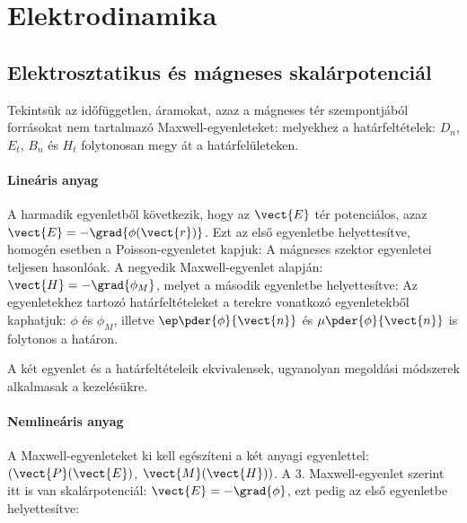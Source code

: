  \section{Elektrodinamika}
  
  \subsection{Elektrosztatikus és mágneses skalárpotenciál}
   
   Tekintsük az időfüggetlen, áramokat, azaz a mágneses tér szempontjából forrásokat nem tartalmazó Maxwell-egyenleteket:
   melyekhez a határfeltételek: $D_n$, $E_t$, $B_n$ és $H_t$ folytonosan megy át a határfelületeken.
   
   \paragraph{Lineáris anyag}
   
    A harmadik egyenletből következik, hogy az $\vect{E}$ tér potenciálos, azaz $\vect{E}=-\grad{\phi(\vect{r})}$.
   Ezt az első egyenletbe helyettesítve, homogén esetben a Poisson-egyenletet kapjuk:
    A mágneses szektor egyenletei teljesen hasonlóak.
   A negyedik Maxwell-egyenlet alapján: $\vect{H}=-\grad{\phi_M}$, melyet a második egyenletbe helyettesítve:
    Az egyenletekhez tartozó határfeltételeket a terekre vonatkozó egyenletekből kaphatjuk: $\phi$ és $\phi_M$, illetve $\ep\pder{\phi}{\vect{n}}$ és $\mu\pder{\phi}{\vect{n}}$ is folytonos a határon.
    
    A két egyenlet és a határfeltételeik ekvivalensek, ugyanolyan megoldási módszerek alkalmasak a kezelésükre.
    
   \paragraph{Nemlineáris anyag}
    
    A Maxwell-egyenleteket ki kell egészíteni a két anyagi egyenlettel: $(\vect{P}(\vect{E})$, $\vect{M}(\vect{H}))$.
   A 3.
   Maxwell-egyenlet szerint itt is van skalárpotenciál: $\vect{E}=-\grad{\phi}$, ezt pedig az első egyenletbe helyettesítve:
    
